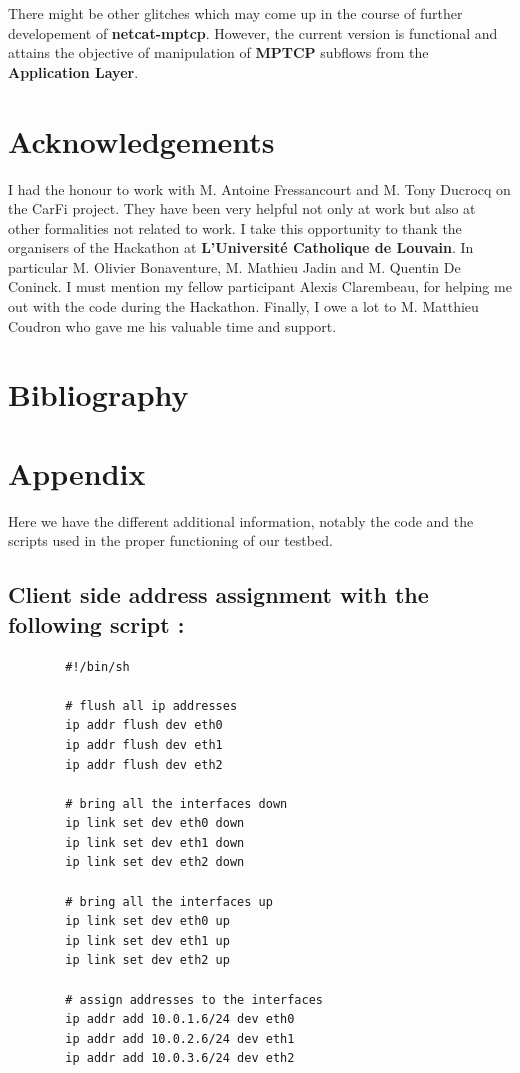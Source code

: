 \documentclass[a4paper,11pt]{article}
\begin{document}
		There might be other glitches which may come up in the course of further developement of \textbf{netcat-mptcp}. However, the current version is functional and attains the objective of manipulation of \textbf{MPTCP} subflows from the \textbf{Application Layer}.
			
		 	
		 	
	\clearpage
	\section{Acknowledgements}
	 
	  	I had the honour to work with M. Antoine Fressancourt and M. Tony Ducrocq on the CarFi project. They have been very helpful not only at work but also at other formalities not related to work. I take this opportunity to thank the organisers of the Hackathon at \textbf{L'Université Catholique de Louvain}. In particular M. Olivier Bonaventure, M. Mathieu Jadin and M. Quentin De Coninck. I must mention my fellow participant Alexis Clarembeau, for helping me out with the code during the Hackathon. Finally, I owe a lot to M. Matthieu Coudron who gave me his valuable time and support.
		 
 	\vspace*{2cm}
 	\section{Bibliography}
		
		


	\clearpage
	\section{Appendix}
		\label{sec:appendix}
	 	Here we have the different additional information, notably the code and the scripts used in the proper functioning of our testbed.

	 	\subsection{Client side address assignment with the following script :}
	 	\label{subsec:clientaddress}
	 	\begin{lstlisting}
	 	#!/bin/sh

	 	# flush all ip addresses
	 	ip addr flush dev eth0
	 	ip addr flush dev eth1
	 	ip addr flush dev eth2

	 	# bring all the interfaces down
	 	ip link set dev eth0 down
	 	ip link set dev eth1 down
	 	ip link set dev eth2 down

	 	# bring all the interfaces up
	 	ip link set dev eth0 up
	 	ip link set dev eth1 up
	 	ip link set dev eth2 up

	 	# assign addresses to the interfaces
	 	ip addr add 10.0.1.6/24 dev eth0
	 	ip addr add 10.0.2.6/24 dev eth1
	 	ip addr add 10.0.3.6/24 dev eth2
	 	\end{lstlisting}
\end{document}
